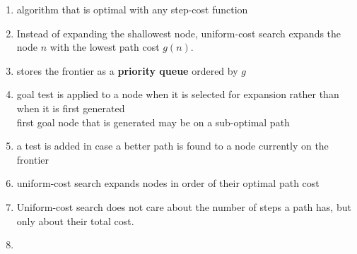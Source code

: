 \begin{enumerate}
    \item algorithm that is optimal with any step-cost function

    \item Instead of expanding the shallowest node, uniform-cost search expands the node $n$ with the lowest path cost $g(n)$.

    \item stores the frontier as a \textbf{priority queue} ordered by $g$

    \item goal test is applied to a node when it is selected for expansion rather than when it is first generated\\
    first goal node that is generated may be on a sub-optimal path

    \item a test is added in case a better path is found to a node currently on the frontier

    \item uniform-cost search expands nodes in order of their optimal path cost

    \item Uniform-cost search does not care about the number of steps a path has, but only about their total cost.

    \item 
\end{enumerate}

\vspace{0.5cm}

